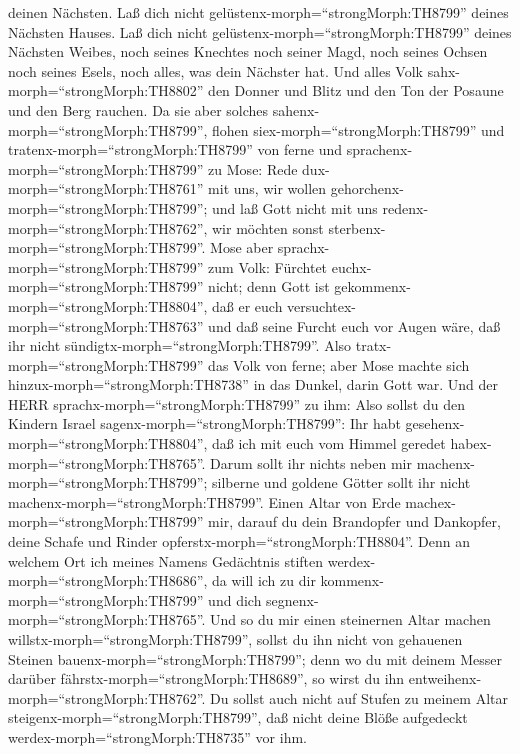 deinen Nächsten.  Laß dich nicht
gelüstenx-morph=``strongMorph:TH8799'' deines Nächsten Hauses. Laß dich
nicht gelüstenx-morph=``strongMorph:TH8799'' deines Nächsten Weibes,
noch seines Knechtes noch seiner Magd, noch seines Ochsen noch seines
Esels, noch alles, was dein Nächster hat.  Und alles Volk
sahx-morph=``strongMorph:TH8802'' den Donner und Blitz und den Ton der
Posaune und den Berg rauchen. Da sie aber solches
sahenx-morph=``strongMorph:TH8799'', flohen
siex-morph=``strongMorph:TH8799'' und
tratenx-morph=``strongMorph:TH8799'' von ferne  und
sprachenx-morph=``strongMorph:TH8799'' zu Mose: Rede
dux-morph=``strongMorph:TH8761'' mit uns, wir wollen
gehorchenx-morph=``strongMorph:TH8799''; und laß Gott nicht mit uns
redenx-morph=``strongMorph:TH8762'', wir möchten sonst
sterbenx-morph=``strongMorph:TH8799''.  Mose aber
sprachx-morph=``strongMorph:TH8799'' zum Volk: Fürchtet
euchx-morph=``strongMorph:TH8799'' nicht; denn Gott ist
gekommenx-morph=``strongMorph:TH8804'', daß er euch
versuchtex-morph=``strongMorph:TH8763'' und daß seine Furcht euch vor
Augen wäre, daß ihr nicht sündigtx-morph=``strongMorph:TH8799''.
 Also tratx-morph=``strongMorph:TH8799'' das Volk von
ferne; aber Mose machte sich hinzux-morph=``strongMorph:TH8738'' in das
Dunkel, darin Gott war.  Und der HERR
sprachx-morph=``strongMorph:TH8799'' zu ihm: Also sollst du den Kindern
Israel sagenx-morph=``strongMorph:TH8799'': Ihr habt
gesehenx-morph=``strongMorph:TH8804'', daß ich mit euch vom Himmel
geredet habex-morph=``strongMorph:TH8765''.  Darum sollt
ihr nichts neben mir machenx-morph=``strongMorph:TH8799''; silberne und
goldene Götter sollt ihr nicht machenx-morph=``strongMorph:TH8799''.
 Einen Altar von Erde machex-morph=``strongMorph:TH8799''
mir, darauf du dein Brandopfer und Dankopfer, deine Schafe und Rinder
opferstx-morph=``strongMorph:TH8804''. Denn an welchem Ort ich meines
Namens Gedächtnis stiften werdex-morph=``strongMorph:TH8686'', da will
ich zu dir kommenx-morph=``strongMorph:TH8799'' und dich
segnenx-morph=``strongMorph:TH8765''.  Und so du mir einen
steinernen Altar machen willstx-morph=``strongMorph:TH8799'', sollst du
ihn nicht von gehauenen Steinen bauenx-morph=``strongMorph:TH8799'';
denn wo du mit deinem Messer darüber
fährstx-morph=``strongMorph:TH8689'', so wirst du ihn
entweihenx-morph=``strongMorph:TH8762''.  Du sollst auch
nicht auf Stufen zu meinem Altar steigenx-morph=``strongMorph:TH8799'',
daß nicht deine Blöße aufgedeckt werdex-morph=``strongMorph:TH8735'' vor
ihm.

